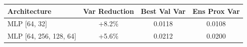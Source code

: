 \begin{tabular}{lccc}
\toprule
Architecture & Var Reduction & Best Val Var & Ens Prox Var \\
\midrule
MLP [64, 32] & +8.2\% & 0.0118 & 0.0108 \\
MLP [64, 256, 128, 64] & +5.6\% & 0.0212 & 0.0200 \\
\bottomrule
\end{tabular}